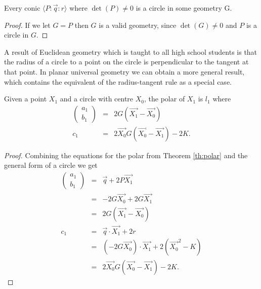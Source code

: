 \begin{corollary}
Every conic $\langle P\!:\!\vec{q}\!:\!r \rangle$ where $\det(P) \neq 0$ is a circle in some geometry G.
\end{corollary}
\begin{proof}
If we let $G = P$ then $G$ is a valid geometry, since $\det(G) \neq 0$ and $P$ is a circle in $G$.
\end{proof}

A result of Euclidean geometry which is taught to all high school students is that the radius of a circle to a point on the circle is perpendicular to the tangent at that point.
In planar universal geometry we can obtain a more general result, which contains the equivalent of the radius-tangent rule as a special case.

\begin{theorem} Given a point $X_1$ and a circle with centre $X_0$, the polar of $X_1$ is $l_1$ where
\begin{eqnarray}
\begin{pmatrix}a_1 \\ b_1\end{pmatrix} & = & 2G(\vec{X_1} - \vec{X_0})\\
c_1 & = & 2\vec{X_0}G(\vec{X_0} - \vec{X_1}) - 2K.
\end{eqnarray}
\end{theorem}
\begin{proof} Combining the equations for the polar from Theorem \ref{th:polar} and the general form of a circle we get
\begin{eqnarray*}
\begin{pmatrix}a_1 \\ b_1\end{pmatrix} & = & \vec{q} + 2P\vec{X_1}\\
 & = & -2G\vec{X_0} + 2G\vec{X_1}\\
 & = & 2G(\vec{X_1} - \vec{X_0})\\
c_1 & = & \vec{q}\cdot\vec{X_1} + 2r\\
    & = & (-2G\vec{X_0})\cdot\vec{X_1} + 2(\vec{X_0}^2 - K)\\
    & = & 2\vec{X_0}G(\vec{X_0} - \vec{X_1}) - 2K.
\end{eqnarray*}
\end{proof}

